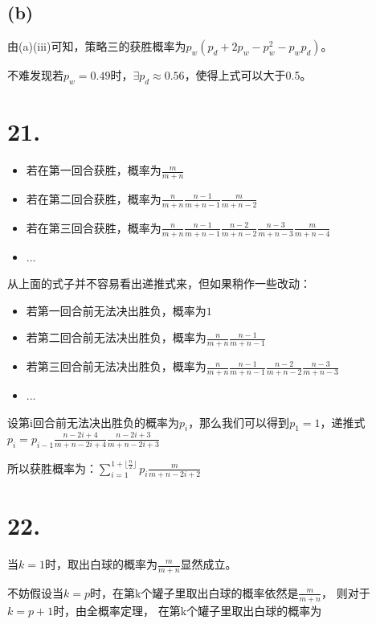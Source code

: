 \documentclass[UTF8]{report}
\begin{document}
        \subsection*{(b)}
            由(a)(iii)可知，策略三的获胜概率为$p_w(p_d + 2p_w - p_w^2 - p_wp_d)$。
            
            不难发现若$p_w = 0.49$时，$\exists p_d \approx 0.56$，使得上式可以大于0.5。
    \section*{21.}
        \begin{itemize}
            \item 若在第一回合获胜，概率为$\frac{m}{m + n}$
            \item 若在第二回合获胜，概率为$\frac{n}{m + n}\frac{n - 1}{m + n - 1}\frac{m}{m + n - 2}$
            \item 若在第三回合获胜，概率为$\frac{n}{m + n}\frac{n - 1}{m + n - 1}\frac{n - 2}{m + n - 2}\frac{n - 3}{m + n - 3}\frac{m}{m + n - 4}$
            \item ...
        \end{itemize}
        
        从上面的式子并不容易看出递推式来，但如果稍作一些改动：
        \begin{itemize}
            \item 若第一回合前无法决出胜负，概率为$1$
            \item 若第二回合前无法决出胜负，概率为$\frac{n}{m + n}\frac{n - 1}{m + n - 1}$
            \item 若第三回合前无法决出胜负，概率为$\frac{n}{m + n}\frac{n - 1}{m + n - 1}\frac{n - 2}{m + n - 2}\frac{n - 3}{m + n - 3}$
            \item ...
        \end{itemize}
        
        设第i回合前无法决出胜负的概率为$p_i$，那么我们可以得到$p_1 = 1$，递推式$p_i = p_{i - 1}\frac{n - 2i + 4}{m + n - 2i + 4}\frac{n - 2i + 3}{m + n -2i + 3}$

        所以获胜概率为：$\sum_{i = 1}^{1 + \lfloor \frac{n}{2} \rfloor}p_i \frac{m}{m + n - 2i + 2}$
    
    \section*{22.}
        当$k = 1$时，取出白球的概率为$\frac{m}{m + n}$显然成立。

        不妨假设当$k = p$时，在第k个罐子里取出白球的概率依然是$\frac{m}{m + n}$，
        则对于$k = p + 1$时，由全概率定理，
        在第k个罐子里取出白球的概率为
        
\end{document}
